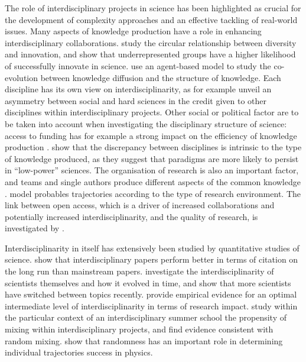 \documentclass[utf8]{frontiersFPHY} %
\begin{document}
The role of interdisciplinary projects in science has been highlighted as crucial for the development of complexity approaches and an effective tackling of real-world issues. Many aspects of knowledge production have a role in enhancing interdisciplinary collaborations. \cite{Hofstra9284} study the circular relationship between diversity and innovation, and show that underrepresented groups have a higher likelihood of successfully innovate in science. \cite{jang2019coevolutionary} use an agent-based model to study the co-evolution between knowledge diffusion and the structure of knowledge. Each discipline has its own view on interdisciplinarity, as for example \cite{urbanska2019does} unveil an asymmetry between social and hard sciences in the credit given to other disciplines within interdisciplinary projects. Other social or political factor are to be taken into account when investigating the disciplinary structure of science: access to funding has for example a strong impact on the efficiency of knowledge production \cite{gross2019contest}. \cite{akerlof2018persistence} show that the discrepancy between disciplines is intrinsic to the type of knowledge produced, as they suggest that paradigms are more likely to persist in ``low-power'' sciences. The organisation of research is also an important factor, and teams and single authors produce different aspects of the common knowledge \cite{pavlidis2014together}. \cite{rouse2018modeling} model probables trajectories according to the type of research environment. The link between open access, which is a driver of increased collaborations and potentially increased interdisciplinarity, and the quality of research, is investigated by \cite{VANVLOKHOVEN2019751}.

Interdisciplinarity in itself has extensively been studied by quantitative studies of science. \cite{2019arXiv191003628T} show that interdisciplinary papers perform better in terms of citation on the long run than mainstream papers. \cite{zeng2019increasing} investigate the interdisciplinarity of scientists themselves and how it evolved in time, and show that more scientists have switched between topics recently. \cite{lariviere2010relationship} provide empirical evidence for an optimal intermediate level of interdisciplinarity in terms of research impact.%
\cite{brown_murray_furlong_coco_dablander_2020} study within the particular context of an interdisciplinary summer school the propensity of mixing within interdisciplinary projects, and find evidence consistent with random mixing. \cite{pluchino2019exploring} show that randomness has an important role in determining individual trajectories success in physics.
\end{document}
